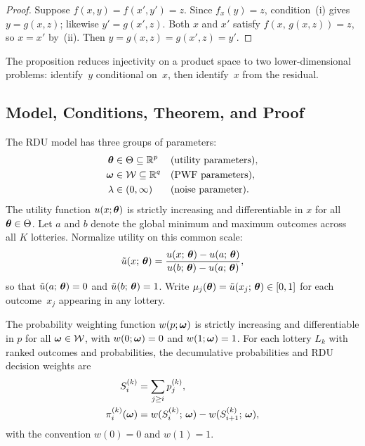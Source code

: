 \begin{proof}
Suppose $f(x,y) = f(x',y') = z$. Since $f_x(y) = z$, condition~(i)
gives $y = g(x,z)$; likewise $y' = g(x',z)$. Both $x$ and $x'$
satisfy $f(x,\, g(x,z)) = z$, so $x = x'$ by~(ii). Then
$y = g(x,z) = g(x',z) = y'$.
\end{proof}

The proposition reduces injectivity on a product space to two
lower-dimensional problems: identify~$y$ conditional on~$x$, then
identify~$x$ from the residual.


\subsection{Model, Conditions, Theorem, and Proof}
\label{appB:model}

The RDU model has three groups of parameters:
\begin{align}
    \boldsymbol{\theta} &\in \Theta \subseteq \mathbb{R}^p
    &&\text{(utility parameters)}, \\
    \boldsymbol{\omega} &\in \mathcal{W} \subseteq \mathbb{R}^q
    &&\text{(PWF parameters)}, \\
    \lambda &\in (0, \infty)
    &&\text{(noise parameter)}.
\end{align}
The utility function $u(x; \boldsymbol{\theta})$ is strictly increasing and
differentiable in $x$ for all $\boldsymbol{\theta} \in \Theta$. Let $a$ and $b$
denote the global minimum and maximum outcomes across all $K$
lotteries. Normalize utility on this common scale:
\begin{equation}\label{eq:normalization}
    \tilde{u}(x;\, \boldsymbol{\theta})
    = \frac{u(x;\, \boldsymbol{\theta}) - u(a;\, \boldsymbol{\theta})}
           {u(b;\, \boldsymbol{\theta}) - u(a;\, \boldsymbol{\theta})},
\end{equation}
so that $\tilde{u}(a;\, \boldsymbol{\theta}) = 0$ and
$\tilde{u}(b;\, \boldsymbol{\theta}) = 1$. Write
$\mu_j(\boldsymbol{\theta}) = \tilde{u}(x_j;\, \boldsymbol{\theta}) \in [0,1]$
for each outcome~$x_j$ appearing in any lottery.

The probability weighting function $w(p; \boldsymbol{\omega})$ is strictly
increasing and differentiable in $p$ for all $\boldsymbol{\omega} \in \mathcal{W}$, with
$w(0; \boldsymbol{\omega}) = 0$ and $w(1; \boldsymbol{\omega}) = 1$. For each lottery $L_k$
with ranked outcomes and probabilities, the decumulative
probabilities and RDU decision weights are
\begin{align}
    S_i^{(k)} &= \sum_{j \geq i} p_j^{(k)}, \\
    \pi_i^{(k)}(\boldsymbol{\omega}) &= w(S_i^{(k)};\, \boldsymbol{\omega})
      - w(S_{i+1}^{(k)};\, \boldsymbol{\omega}),
\end{align}
with the convention $w(0) = 0$ and $w(1) = 1$.

